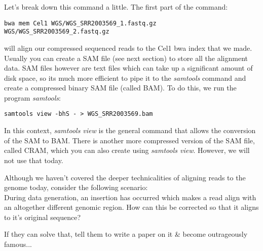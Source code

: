 Let's break down this command a little. The first part of the command:
\begin{lstlisting}[style=command_syntax]
bwa mem Cel1 WGS/WGS_SRR2003569_1.fastq.gz WGS/WGS_SRR2003569_2.fastq.gz
\end{lstlisting}
will align our compressed sequenced reads to the Cel1 bwa index that we made.
Usually you can create a SAM file (see next section) to store all the alignment data. SAM files however are text files which can take up a significant amount of disk space, so its much more efficient to pipe it to the \textit{samtools} command and create a compressed binary SAM file (called BAM).
To do this, we run the program \textit{samtools}:
\begin{lstlisting}[style=command_syntax]
samtools view -bhS - > WGS_SRR2003569.bam
\end{lstlisting}
In this context, \textit{samtools view} is the general command that allows the conversion of the SAM to BAM.
There is another more compressed version of the SAM file, called CRAM, which you can also create using \textit{samtools view}.
However, we will not use that today.

\begin{advanced}
\begin{questions}
Although we haven't covered the deeper technicalities of aligning reads to the genome today, consider the following scenario:\\

During data generation, an insertion has occurred which makes a read align with an altogether different genomic region.
How can this be corrected so that it aligns to it's original sequence? \\
\begin{answer}
If they can solve that, tell them to write a paper on it \& become outrageously famous...
\end{answer}
\end{questions}
\end{advanced}

